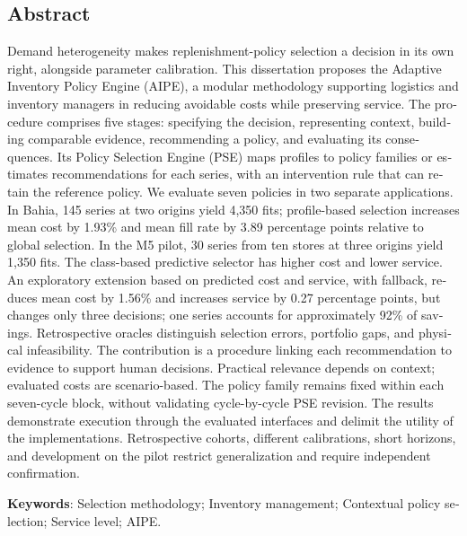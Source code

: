 \begin{otherlanguage}{english}
\chapter*{\centering Abstract}
Demand heterogeneity makes replenishment-policy selection a decision in its own right, alongside parameter calibration. This dissertation proposes the Adaptive Inventory Policy Engine (AIPE), a modular methodology supporting logistics and inventory managers in reducing avoidable costs while preserving service. The procedure comprises five stages: specifying the decision, representing context, building comparable evidence, recommending a policy, and evaluating its consequences. Its Policy Selection Engine (PSE) maps profiles to policy families or estimates recommendations for each series, with an intervention rule that can retain the reference policy. We evaluate seven policies in two separate applications. In Bahia, 145 series at two origins yield 4,350 fits; profile-based selection increases mean cost by 1.93\% and mean fill rate by 3.89 percentage points relative to global selection. In the M5 pilot, 30 series from ten stores at three origins yield 1,350 fits. The class-based predictive selector has higher cost and lower service. An exploratory extension based on predicted cost and service, with fallback, reduces mean cost by 1.56\% and increases service by 0.27 percentage points, but changes only three decisions; one series accounts for approximately 92\% of savings. Retrospective oracles distinguish selection errors, portfolio gaps, and physical infeasibility. The contribution is a procedure linking each recommendation to evidence to support human decisions. Practical relevance depends on context; evaluated costs are scenario-based. The policy family remains fixed within each seven-cycle block, without validating cycle-by-cycle PSE revision. The results demonstrate execution through the evaluated interfaces and delimit the utility of the implementations. Retrospective cohorts, different calibrations, short horizons, and development on the pilot restrict generalization and require independent confirmation.

\vspace{2em}
\textbf{Keywords}: Selection methodology; Inventory management; Contextual policy selection; Service level; AIPE.
\end{otherlanguage}
